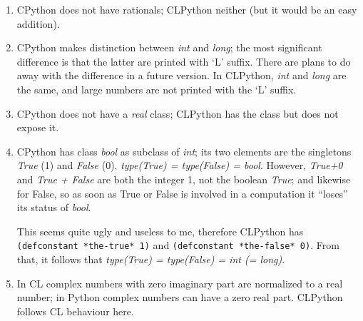 \documentclass{article}
\begin{document}
\begin{enumerate}

 \item{} CPython does not have rationals; CLPython neither (but it would be an easy addition).

 \item{} CPython makes distinction between {\em int} and {\em long};
         the most significant difference is that the latter are
         printed with `L' suffix.  There are plans to do away with the
         difference in a future version. In CLPython, {\em int} and
         {\em long} are the same, and large numbers are not printed
         with the `L' suffix.

 \item{} CPython does not have a {\em real} class; CLPython has the
         class but does not expose it.

 \item{} CPython has class {\em bool} as subclass of {\em int}; its
         two elements are the singletons {\em True} (1) and {\em
         False} (0). {\em type(True) = type(False) = bool}. However,
         {\em True+0} and {\em True + False} are both the integer 1,
         not the boolean {\em True}; and likewise for False, so as
         soon as True or False is involved in a computation it
         ``loses'' its status of {\em bool}.

         This seems quite ugly and useless to me, therefore CLPython
         has {\tt (defconstant *the-true* 1)} and {\tt (defconstant
         *the-false* 0)}. From that, it follows that {\em type(True) =
         type(False) = int (= long)}.

 \item{} In CL complex numbers with zero imaginary part are normalized
   to a real number; in Python complex numbers can have a zero real
   part. CLPython follows CL behaviour here.

\end{enumerate}
\end{document}
